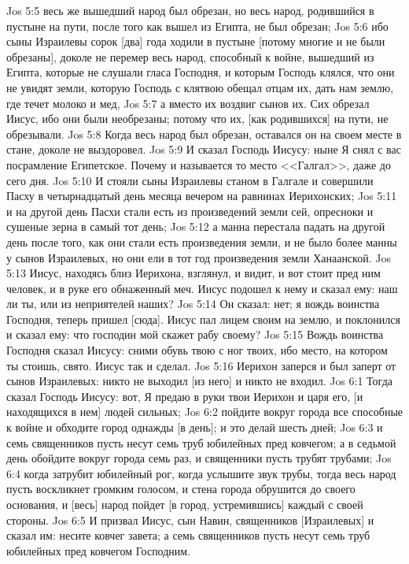 \vs Jos 5:5 весь же вышедший народ был обрезан, но весь народ, родившийся в пустыне на пути, после того как вышел из Египта, не был обрезан;
\vs Jos 5:6 ибо сыны Израилевы сорок [два] года ходили в пустыне [потому многие и не были обрезаны], доколе не перемер весь народ, способный к войне, вышедший из Египта, которые не слушали гласа Господня, и которым Господь клялся, что они не увидят земли, которую Господь с клятвою обещал отцам их, дать нам землю, где течет молоко и мед,
\vs Jos 5:7 а вместо их воздвиг сынов их. Сих обрезал Иисус, ибо они были необрезаны; потому что их, [как родившихся] на пути, не обрезывали.
\vs Jos 5:8 Когда весь народ был обрезан, оставался он на своем месте в стане, доколе не выздоровел.
\vs Jos 5:9 И сказал Господь Иисусу: ныне Я снял с вас посрамление Египетское. Почему и называется то место <<Галгал>>, даже до сего дня.
\vs Jos 5:10 И стояли сыны Израилевы станом в Галгале и совершили Пасху в четырнадцатый день месяца вечером на равнинах Иерихонских;
\vs Jos 5:11 и на другой день Пасхи стали есть из произведений земли сей, опресноки и сушеные зерна в самый тот день;
\vs Jos 5:12 а манна перестала падать на другой день после того, как они стали есть произведения земли, и не было более манны у сынов Израилевых, но они ели в тот год произведения земли Ханаанской.
\rsbpar\vs Jos 5:13 Иисус, находясь близ Иерихона, взглянул, и видит, и вот стоит пред ним человек, и в руке его обнаженный меч. Иисус подошел к нему и сказал ему: наш ли ты, или из неприятелей наших?
\vs Jos 5:14 Он сказал: нет; я вождь воинства Господня, теперь пришел [сюда]. Иисус пал лицем своим на землю, и поклонился и сказал ему: что господин мой скажет рабу своему?
\vs Jos 5:15 Вождь воинства Господня сказал Иисусу: сними обувь твою с ног твоих, ибо место, на котором ты стоишь, свято. Иисус так и сделал.
\rsbpar\vs Jos 5:16 Иерихон заперся и был заперт от  сынов Израилевых: никто не выходил [из него] и никто не входил.
\vs Jos 6:1 Тогда сказал Господь Иисусу: вот, Я предаю в руки твои Иерихон и царя его, [и находящихся в нем] людей сильных;
\vs Jos 6:2 пойдите вокруг города все способные к войне и обходите город однажды [в день]; и это делай шесть дней;
\vs Jos 6:3 и семь священников пусть несут семь труб юбилейных пред ковчегом; а в седьмой день обойдите вокруг города семь раз, и священники пусть трубят трубами;
\vs Jos 6:4 когда затрубит юбилейный рог, когда услышите звук трубы, тогда весь народ пусть воскликнет громким голосом, и стена города обрушится до своего основания, и [весь] народ пойдет [в город, устремившись] каждый с своей стороны.
\rsbpar\vs Jos 6:5 И призвал Иисус, сын Навин, священников [Израилевых] и сказал им: несите ковчег завета; а семь священников пусть несут семь труб юбилейных пред ковчегом Господним.
